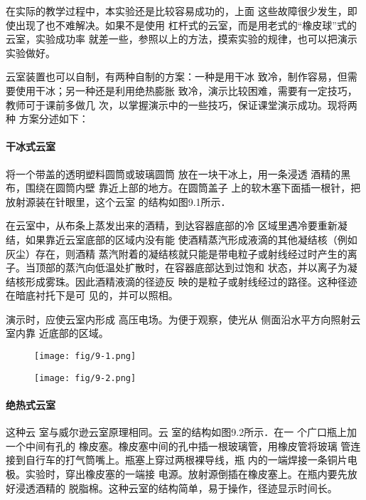 在实际的教学过程中，本实验还是比较容易成功的，上面
这些故障很少发生，即使出现了也不难解决。如果不是使用
杠杆式的云室，而是用老式的“橡皮球”式的云室，实验成功率
就差一些，参照以上的方法，摸索实验的规律，也可以把演示
实验做好。

云室装置也可以自制，有两种自制的方案：一种是用干冰
致冷，制作容易，但需要使用干冰；另一种还是利用绝热膨胀
致冷，演示比较困难，需要有一定技巧，教师可于课前多做几
次，以掌握演示中的一些技巧，保证课堂演示成功。现将两种
方案分述如下：

\paragraph{干冰式云室} 将一个带盖的透明塑料圆筒或玻璃圆筒
放在一块干冰上，用一条浸透
酒精的黑布，围绕在圆筒内壁
靠近上部的地方。在圆筒盖子
上的软木塞下面插一根针，把
放射源装在针眼里，这个云室
的结构如图9.1所示．

在云室中，从布条上蒸发出来的酒精，到达容器底部的冷
区域里遇冷要重新凝结，如果靠近云室底部的区域内没有能
使酒精蒸汽形成液滴的其他凝结核（例如灰尘）存在，则酒精
蒸汽附着的凝结核就只能是带电粒子或射线经过时产生的离
子。当顶部的蒸汽向低温处扩散时，在容器底部达到过饱和
状态，并以离子为凝结核形成雾珠。因此酒精液滴的径迹反
映的是粒子或射线经过的路径。这种径迹在暗底衬托下是可
见的，并可以照相。

演示时，应使云室内形成
高压电场。为便于观察，使光从
侧面沿水平方向照射云室内靠
近底部的区域。

\begin{figure}[htp]\centering
    \begin{minipage}[t]{0.48\textwidth}
    \centering
\texttt{[image: fig/9-1.png]}
    \caption{}
    \end{minipage}
    \begin{minipage}[t]{0.48\textwidth}
    \centering
\texttt{[image: fig/9-2.png]}
    \caption{}
    \end{minipage}
    \end{figure}

\paragraph{绝热式云室} 这种云
室与威尔逊云室原理相同。云
室的结构如图9.2所示．在一
个广口瓶上加一个中间有孔的
橡皮塞。橡皮塞中间的孔中插一根玻璃管，用橡皮管将玻璃
管连接到自行车的打气筒嘴上。瓶塞上穿过两根裸导线，瓶
内的一端焊接一条铜片电极。实验时，穿出橡皮塞的一端接
电源。放射源倒插在橡皮塞上。在瓶内要先放好浸透酒精的
脱脂棉。这种云室的结构简单，易于操作，径迹显示时间长。

